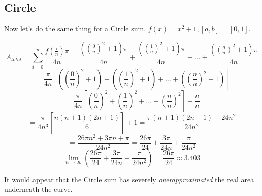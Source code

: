 \documentclass{article}
\begin{document}
    \subsection{Circle}
      Now let's do the same thing for a Circle sum. \( f(x) = x^2 + 1, [a,b] = [0,1]\).

      \[ A_{total} = \displaystyle\sum_{i=0}^n \frac{f(\frac{i}{n})\pi}{4n} = \frac{\left((\frac{0}{n})^2+1\right)\pi}{4n} + \frac{\left((\frac{1}{n})^2+1\right)\pi}{4n} + \dots + \frac{\left((\frac{n}{n})^2+1\right)\pi}{4n} \]
      \[ = \frac{\pi}{4n}\left[ \left( \left(\frac{0}{n}\right)^2 + 1 \right) + \left( \left(\frac{1}{n}\right)^2 + 1 \right) + \dots + \left( \left(\frac{n}{n}\right)^2 + 1 \right) \right] \]
      \[ = \frac{\pi}{4n}\left[ \left( \frac{0}{n} \right)^2 + \left( \frac{1}{n} \right)^2 + \dots + \left( \frac{n}{n} \right)^2 \right] + \frac{n}{n} \]
      \[ = \frac{\pi}{4n^3}\left[ \frac{n(n+1)(2n+1)}{6} \right] + 1 = \frac{\pi(n+1)(2n+1) + 24n^2}{24n^2} \]
      \[ = \frac{26\pi n^2+3\pi n+\pi}{24n^2} = \frac{26\pi}{24} + \frac{3\pi}{24n} + \frac{\pi}{24n^2} \]
      \[ \displaystyle \lim_{n \to \infty}\left(\frac{26\pi}{24} + \frac{3\pi}{24n} + \frac{\pi}{24n^2}\right) = \frac{26\pi}{24} \approx 3.403 \]

      It would appear that the Circle sum has severely \emph{overapproximated} the real area underneath the curve.
\end{document}
